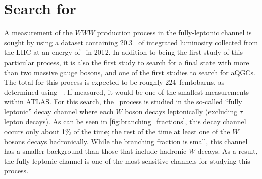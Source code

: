 \chapter{Search for \wwwlll}
\label{sec:www}





A measurement of the $WWW$ production process
in the fully-leptonic channel
is sought by using a dataset containing 20.3 \ifb~of integrated luminosity
collected from the LHC at an energy of \energy~in 2012.
In addition to being the first study of this particular process,
it is also the first study to search for a final state with more 
than two massive gauge bosons, and one of the first studies
to search for aQGCs.
The total \xsec for this process is expected
to be roughly $224$~femtobarns, as determined using 
\madgraph~\cite{MadGraph}. If measured, it 
would be one of the smallest \xsec measurements
within ATLAS. %
For this search, the \www~process is studied in the 
so-called ``fully leptonic'' decay channel
where each $W$ boson decays leptonically (excluding $\tau$ lepton decays).
As can be seen in \fig\ref{fig:branching_fractions},
this decay channel occurs only about 1\% of the time;
the rest of the time
at least one of the $W$ bosons decays hadronically.
While the branching fraction is small,
this channel has a smaller background than those 
that include hadronic $W$ decays.
As a result, the fully leptonic channel
is one of the most sensitive channels
for studying this process.


